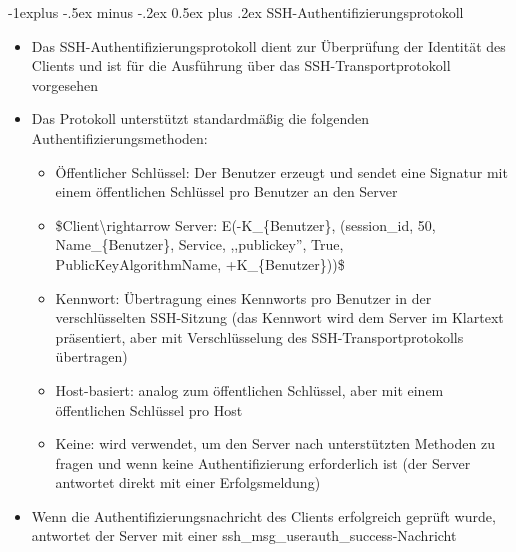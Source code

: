 \documentclass[a4paper]{article}
\makeatletter
\renewcommand{\subsection}{\@startsection{subsection}{2}{0mm}%
 {-1explus -.5ex minus -.2ex}%
 {0.5ex plus .2ex}%
 {\normalfont\normalsize\bfseries}}
\makeatother
\begin{document}
\begin{multicols}{3}
    \subsection{SSH-Authentifizierungsprotokoll}

    \begin{itemize}
        \item
              Das SSH-Authentifizierungsprotokoll dient zur Überprüfung der
              Identität des Clients und ist für die Ausführung über das
              SSH-Transportprotokoll vorgesehen
        \item
              Das Protokoll unterstützt standardmäßig die folgenden
              Authentifizierungsmethoden:

              \begin{itemize}
                  \item
                        Öffentlicher Schlüssel: Der Benutzer erzeugt und sendet eine
                        Signatur mit einem öffentlichen Schlüssel pro Benutzer an den Server
                  \item
                        \$Client\textbackslash rightarrow Server: E(-K\_\{Benutzer\},
                        (session\_id, 50, Name\_\{Benutzer\}, Service, ,,publickey'', True,
                        PublicKeyAlgorithmName, +K\_\{Benutzer\}))\$
                  \item
                        Kennwort: Übertragung eines Kennworts pro Benutzer in der
                        verschlüsselten SSH-Sitzung (das Kennwort wird dem Server im
                        Klartext präsentiert, aber mit Verschlüsselung des
                        SSH-Transportprotokolls übertragen)
                  \item
                        Host-basiert: analog zum öffentlichen Schlüssel, aber mit einem
                        öffentlichen Schlüssel pro Host
                  \item
                        Keine: wird verwendet, um den Server nach unterstützten Methoden zu
                        fragen und wenn keine Authentifizierung erforderlich ist (der Server
                        antwortet direkt mit einer Erfolgsmeldung)
              \end{itemize}
        \item
              Wenn die Authentifizierungsnachricht des Clients erfolgreich geprüft
              wurde, antwortet der Server mit einer
              ssh\_msg\_userauth\_success-Nachricht
    \end{itemize}



\end{multicols}
\end{document}
